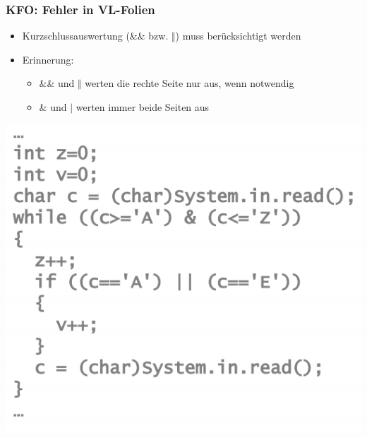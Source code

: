\documentclass[18pt]{beamer}
\begin{document}
	\begin{frame}
		\frametitle{KFO: Fehler in VL-Folien}
		\begin{itemize}
			\item Kurzschlussauswertung (\&\& bzw. $\Vert$) muss berücksichtigt werden \pause
			\item Erinnerung: 
			\begin{itemize}
				\item \&\& und $\Vert$ werten die rechte Seite nur aus, wenn notwendig
				\item \& und $\vert$ werten immer beide Seiten aus \pause
			\end{itemize}
		\end{itemize}
		\centering \includegraphics[scale=0.4]{./pics/tut6/code.png}
\end{frame}
	
\end{document}
